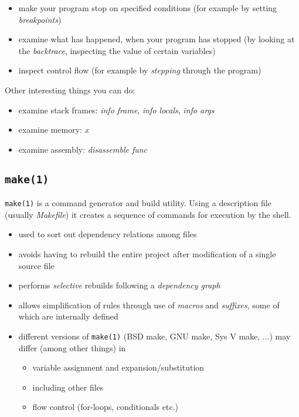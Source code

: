 \documentclass[xga]{xdvislides}
\begin{document}
\begin{itemize}
	\item make your program stop on specified conditions (for example by
		setting {\em breakpoints})
	\item examine what has happened, when your program has stopped (by looking
		at the {\em backtrace}, inspecting the value of certain variables)
	\item inspect control flow (for example by {\em stepping} through the
		program)
\end{itemize}
\vspace{.25in}
Other interesting things you can do:

\begin{itemize}
	\item examine stack frames: {\em info frame}, {\em info locals}, {\em info
		args}
	\item examine memory: {\em x}
	\item examine assembly: {\em disassemble func}
\end{itemize}

\subsection{{\tt make(1)}}
{\tt make(1)} is a command generator and build utility. Using a
description file (usually {\em Makefile}) it creates a sequence of
commands for execution by the shell.

\begin{itemize}
	\item used to sort out dependency relations among files
	\item avoids having to rebuild the entire project after modification of a
		single source file
	\item performs {\em selective} rebuilds following a {\em dependency graph}
	\item allows simplification of rules through use of {\em macros} and {\em
		suffixes}, some of which are internally defined
	\item different versions of {\tt make(1)} (BSD make, GNU make, Sys V make,
		...) may differ (among other things) in
		\begin{itemize}
			\item variable assignment and expansion/substitution
			\item including other files
			\item flow control (for-loops, conditionals etc.)
		\end{itemize}
\end{itemize}
\end{document}
